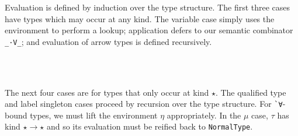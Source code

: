 \documentclass[authoryear, acmsmall, screen, review, nonacm]{acmart}
\begin{document}
Evaluation is defined by induction over the type structure. The first three cases have types which may occur at any kind. The variable case simply uses the environment to perform a lookup; application defers to our semantic combinator \verb!_·V_!; and evaluation of arrow types is defined recursively.

\begin{code}%
\>[0]\AgdaSpace{}%
\AgdaSymbol{\{}\AgdaSpace{}%
\AgdaSymbol{=}\AgdaSpace{}%
\AgdaSymbol{\}}\AgdaSpace{}%
\AgdaSymbol{(}\AgdaSpace{}%
\AgdaSymbol{)}\AgdaSpace{}%
\AgdaSpace{}%
\AgdaSymbol{=}\AgdaSpace{}%
\AgdaSpace{}%
\<%
\\
\>[0]\AgdaSpace{}%
\AgdaSymbol{\{}\AgdaSpace{}%
\AgdaSymbol{=}\AgdaSpace{}%
\AgdaSymbol{\}}\AgdaSpace{}%
\AgdaSymbol{(}\AgdaSpace{}%
\AgdaSpace{}%
\AgdaSymbol{)}\AgdaSpace{}%
\AgdaSpace{}%
\AgdaSymbol{=}\AgdaSpace{}%
\AgdaSymbol{(}\AgdaSpace{}%
\AgdaSpace{}%
\AgdaSymbol{)}\AgdaSpace{}%
\AgdaSpace{}%
\AgdaSymbol{(}\AgdaSpace{}%
\AgdaSpace{}%
\AgdaSymbol{)}\<%
\\
\>[0]\AgdaSpace{}%
\AgdaSymbol{\{}\AgdaSpace{}%
\AgdaSymbol{=}\AgdaSpace{}%
\AgdaSymbol{\}}\AgdaSpace{}%
\AgdaSymbol{(}\AgdaSpace{}%
\AgdaSpace{}%
\AgdaSymbol{)}\AgdaSpace{}%
\AgdaSpace{}%
\AgdaSymbol{=}\AgdaSpace{}%
\AgdaSymbol{(}\AgdaSpace{}%
\AgdaSpace{}%
\AgdaSymbol{)}\AgdaSpace{}%
\AgdaSpace{}%
\AgdaSymbol{(}\AgdaSpace{}%
\AgdaSpace{}%
\AgdaSymbol{)}\<%
\end{code}

\Ni The next four cases are for types that only occur at kind $\star$. The qualified type and label singleton cases proceed by recursion over the type structure. For \verb!`∀!-bound types, we must lift the environment $\eta$ appropriately. In the $\mu$ case, $\tau$ has kind $\star \to \star$ and so its evaluation must be reified back to \verb!NormalType!.
\end{document}
